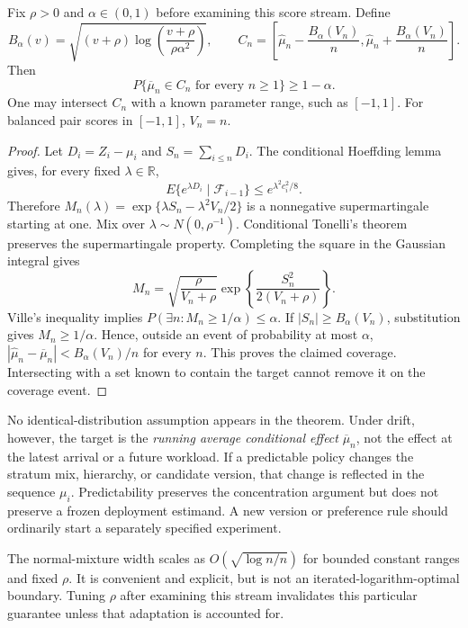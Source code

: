 \begin{theorem}\label{thm:normal_cs}
Fix $\rho>0$ and $\alpha\in(0,1)$ before examining this score stream.
Define
\begin{equation}
 B_\alpha(v)=
 \sqrt{(v+\rho)\log\!\left(\frac{v+\rho}{\rho\alpha^2}\right)},
 \qquad
 C_n=\left[\widehat\mu_n-\frac{B_\alpha(V_n)}n,
           \widehat\mu_n+\frac{B_\alpha(V_n)}n\right].
 \label{eq:normal_cs}
\end{equation}
Then
\[
 P\{\overline\mu_n\in C_n\text{ for every }n\geq1\}\geq1-\alpha.
\]
One may intersect $C_n$ with a known parameter range, such as $[-1,1]$.
For balanced pair scores in $[-1,1]$, $V_n=n$.
\end{theorem}
\begin{proof}
Let $D_i=Z_i-\mu_i$ and $S_n=\sum_{i\leq n}D_i$.
The conditional Hoeffding lemma gives, for every fixed
$\lambda\in\mathbb R$,
\[
 E\{e^{\lambda D_i}\mid\mathcal F_{i-1}\}
 \leq e^{\lambda^2c_i^2/8}.
\]
Therefore $M_n(\lambda)=\exp\{\lambda S_n-\lambda^2V_n/2\}$ is a
nonnegative supermartingale starting at one. Mix over
$\lambda\sim N(0,\rho^{-1})$. Conditional Tonelli's theorem preserves
the supermartingale property. Completing the square in the Gaussian
integral gives
\[
 M_n=\sqrt{\frac\rho{V_n+\rho}}
      \exp\!\left\{\frac{S_n^2}{2(V_n+\rho)}\right\}.
\]
Ville's inequality implies $P(\exists n:M_n\geq1/\alpha)\leq\alpha$.
If $|S_n|\geq B_\alpha(V_n)$, substitution gives
$M_n\geq1/\alpha$. Hence, outside an event of probability at most
$\alpha$, $|\widehat\mu_n-\overline\mu_n|<B_\alpha(V_n)/n$ for every
$n$. This proves the claimed coverage. Intersecting with a set known
to contain the target cannot remove it on the coverage event.
\end{proof}

No identical-distribution assumption appears in the theorem. Under
drift, however, the target is the \emph{running average conditional
effect} $\overline\mu_n$, not the effect at the latest arrival or a
future workload. If a predictable policy changes the stratum mix,
hierarchy, or candidate version, that change is reflected in the sequence
$\mu_i$. Predictability preserves the concentration argument but does
not preserve a frozen deployment estimand. A new version or preference
rule should ordinarily start a separately specified experiment.

The normal-mixture width scales as $O(\sqrt{\log n/n})$ for bounded
constant ranges and fixed $\rho$. It is convenient and explicit, but
is not an iterated-logarithm-optimal boundary. Tuning $\rho$ after
examining this stream invalidates this particular guarantee unless that
adaptation is accounted for.

